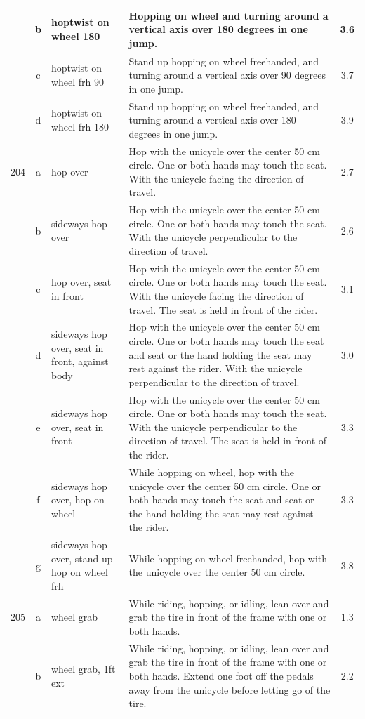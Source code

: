 \begin{longtable}{|r|c|p{4cm}|p{8cm}|c|}
\hline
  & b & hoptwist on wheel 180 & Hopping on wheel and turning around a vertical axis over 180 degrees in one jump. & 3.6 \\ 
\hline
  & c & hoptwist on wheel frh 90  & Stand up hopping on wheel freehanded, and turning around a vertical axis over 90 degrees in one jump. & 3.7 \\ 
\hline
  & d & hoptwist on wheel frh 180 & Stand up hopping on wheel freehanded, and turning around a vertical axis over 180 degrees in one jump.  & 3.9 \\ 
\hline
204 & a & hop over  & Hop with the unicycle over the center 50 cm circle. One or both hands may touch the seat. With the unicycle facing the direction of travel. & 2.7 \\ 
\hline
  & b & sideways hop over & Hop with the unicycle over the center 50 cm circle. One or both hands may touch the seat. With the unicycle perpendicular to the direction of travel. & 2.6 \\ 
\hline
  & c & hop over, seat in front & Hop with the unicycle over the center 50 cm circle. One or both hands may touch the seat. With the unicycle facing the direction of travel. The seat is held in front of the rider. & 3.1 \\ 
\hline
  & d & sideways hop over, seat in front, against body  & Hop with the unicycle over the center 50 cm circle. One or both hands may touch the seat and seat or the hand holding the seat may rest against the rider. With the unicycle perpendicular to the direction of travel.  & 3.0 \\ 
\hline
  & e & sideways hop over, seat in front  & Hop with the unicycle over the center 50 cm circle. One or both hands may touch the seat. With the unicycle perpendicular to the direction of travel. The seat is held in front of the rider. & 3.3 \\ 
\hline
  & f & sideways hop over, hop on wheel & While hopping on wheel, hop with the unicycle over the center 50 cm circle. One or both hands may touch the seat and seat or the hand holding the seat may rest against the rider.  & 3.3 \\ 
\hline
  & g & sideways hop over, stand up hop on wheel frh  & While hopping on wheel freehanded, hop with the unicycle over the center 50 cm circle.  & 3.8 \\ 
\hline
205 & a & wheel grab  & While riding, hopping, or idling, lean over and grab the tire in front of the frame with one or both hands. & 1.3 \\ 
\hline
  & b & wheel grab, 1ft ext & While riding, hopping, or idling, lean over and grab the tire in front of the frame with one or both hands. Extend one foot off the pedals away from the unicycle before letting go of the tire.  & 2.2 \\ 

\end{longtable}
